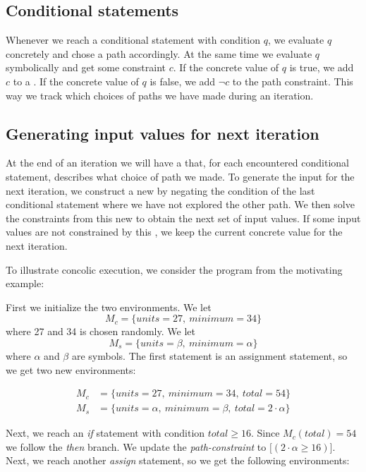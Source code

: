 	\subsection{Conditional statements}
	
	Whenever we reach a conditional statement with condition $q$, we evaluate $q$ concretely and chose a path accordingly. At the same time we evaluate $q$ symbolically and get some constraint $c$. If the concrete value of $q$ is true, we add $c$ to a \pc. If the concrete value of $q$ is false, we add $\neg c$ to the path constraint. This way we track which choices of paths we have made during an iteration. 
	
	\subsection{Generating input values for next iteration}
	
	At the end of an iteration we will have a \pc that, for each encountered conditional statement, describes what choice of path we made. To generate the input for the next iteration, we construct a new \pc by negating the condition of the last conditional statement where we have not explored the other path. We then solve the constraints from this new \pc to obtain the next set of input values. If some input values are not constrained by this \pc, we keep the current concrete value for the next iteration. 

\bigskip
To illustrate concolic execution, we consider the program from the motivating example:
\motexample

\noindent First we initialize the two environments. We let 
\begin{equation*}
	M_c = \{units = 27, \ minimum = 34\}
\end{equation*}
 where 27 and 34 is chosen randomly. We let
\begin{equation*}
 	M_s = \{units =\beta, \ minimum = \alpha\}
\end{equation*}
where $\alpha$ and $\beta$ are symbols. The first statement is an assignment statement, so we get two new environments:

\begin{align*}
	M_c & = \{units = 27, \ minimum = 34, \ total = 54 \}\\
	M_s & = \{units = \alpha, \ minimum = \beta, \ total = 2\cdot \alpha \}
\end{align*}

Next, we reach an \textsl{if} statement with condition $total \geq 16$. Since $M_c(total) = 54$ we follow the \textsl{then} branch. We update the \emph{path-constraint} to $\lbrack (2\cdot \alpha \geq 16) \rbrack$. Next, we reach another \textsl{assign} statement, so we get the following environments:

